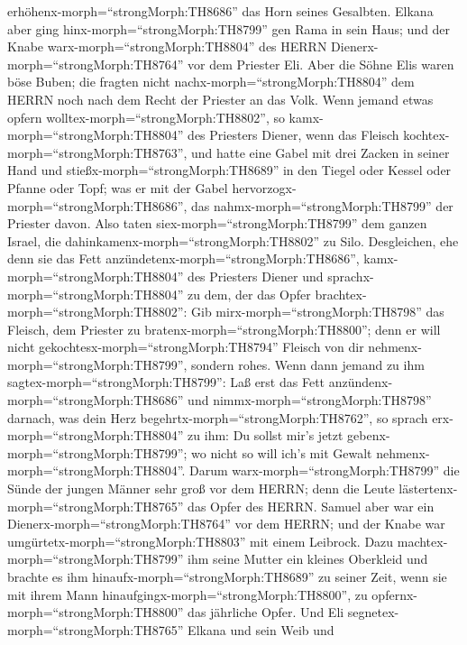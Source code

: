 erhöhenx-morph=``strongMorph:TH8686'' das Horn seines Gesalbten.
 Elkana aber ging hinx-morph=``strongMorph:TH8799'' gen
Rama in sein Haus; und der Knabe warx-morph=``strongMorph:TH8804'' des
HERRN Dienerx-morph=``strongMorph:TH8764'' vor dem Priester Eli.
 Aber die Söhne Elis waren böse Buben; die fragten nicht
nachx-morph=``strongMorph:TH8804'' dem HERRN  noch nach dem
Recht der Priester an das Volk. Wenn jemand etwas opfern
wolltex-morph=``strongMorph:TH8802'', so
kamx-morph=``strongMorph:TH8804'' des Priesters Diener, wenn das Fleisch
kochtex-morph=``strongMorph:TH8763'', und hatte eine Gabel mit drei
Zacken in seiner Hand  und
stießx-morph=``strongMorph:TH8689'' in den Tiegel oder Kessel oder
Pfanne oder Topf; was er mit der Gabel
hervorzogx-morph=``strongMorph:TH8686'', das
nahmx-morph=``strongMorph:TH8799'' der Priester davon. Also taten
siex-morph=``strongMorph:TH8799'' dem ganzen Israel, die
dahinkamenx-morph=``strongMorph:TH8802'' zu Silo. 
Desgleichen, ehe denn sie das Fett
anzündetenx-morph=``strongMorph:TH8686'',
kamx-morph=``strongMorph:TH8804'' des Priesters Diener und
sprachx-morph=``strongMorph:TH8804'' zu dem, der das Opfer
brachtex-morph=``strongMorph:TH8802'': Gib
mirx-morph=``strongMorph:TH8798'' das Fleisch, dem Priester zu
bratenx-morph=``strongMorph:TH8800''; denn er will nicht
gekochtesx-morph=``strongMorph:TH8794'' Fleisch von dir
nehmenx-morph=``strongMorph:TH8799'', sondern rohes.  Wenn
dann jemand zu ihm sagtex-morph=``strongMorph:TH8799'': Laß erst das
Fett anzündenx-morph=``strongMorph:TH8686'' und
nimmx-morph=``strongMorph:TH8798'' darnach, was dein Herz
begehrtx-morph=``strongMorph:TH8762'', so sprach
erx-morph=``strongMorph:TH8804'' zu ihm: Du sollst mir's jetzt
gebenx-morph=``strongMorph:TH8799''; wo nicht so will ich's mit Gewalt
nehmenx-morph=``strongMorph:TH8804''.  Darum
warx-morph=``strongMorph:TH8799'' die Sünde der jungen Männer sehr groß
vor dem HERRN; denn die Leute lästertenx-morph=``strongMorph:TH8765''
das Opfer des HERRN.  Samuel aber war ein
Dienerx-morph=``strongMorph:TH8764'' vor dem HERRN; und der Knabe war
umgürtetx-morph=``strongMorph:TH8803'' mit einem Leibrock. 
Dazu machtex-morph=``strongMorph:TH8799'' ihm seine Mutter ein kleines
Oberkleid und brachte es ihm hinaufx-morph=``strongMorph:TH8689'' zu
seiner Zeit, wenn sie mit ihrem Mann
hinaufgingx-morph=``strongMorph:TH8800'', zu
opfernx-morph=``strongMorph:TH8800'' das jährliche Opfer. 
Und Eli segnetex-morph=``strongMorph:TH8765'' Elkana und sein Weib und
